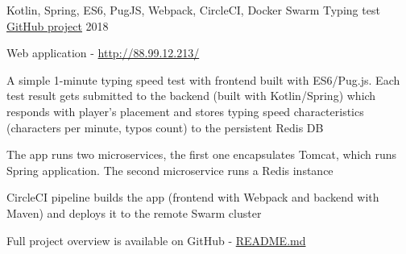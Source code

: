 \begin{cventries}
  \cventry
    {Kotlin, Spring, ES6, PugJS, Webpack, CircleCI, Docker Swarm}
    {Typing test}
    {\color{awesome-skyblue}\href{https://github.com/zhukovsd/typing-test}{\underline{GitHub project}}}
    {2018}
    {
      \begin{cvitems} %
        \item {Web application - {\color{awesome-skyblue}\href{http://88.99.12.213/}{http://88.99.12.213/}}}
        \item {A simple 1-minute typing speed test with frontend built with ES6/Pug.js. Each test result gets submitted to the backend (built with Kotlin/Spring) which responds with player's placement and stores typing speed characteristics (characters per minute, typos count) to the persistent Redis DB}
        \item {The app runs two microservices, the first one encapsulates Tomcat, which runs Spring application. The second microservice runs a Redis instance}
        \item {CircleCI pipeline builds the app (frontend with Webpack and backend with Maven) and deploys it to the remote Swarm cluster}
        \item Full project overview is available on GitHub - {\color{awesome-skyblue}\href{https://github.com/zhukovsd/typing-test/blob/master/README.md}{README.md}}
      \end{cvitems}
    }    
    
\end{cventries}
